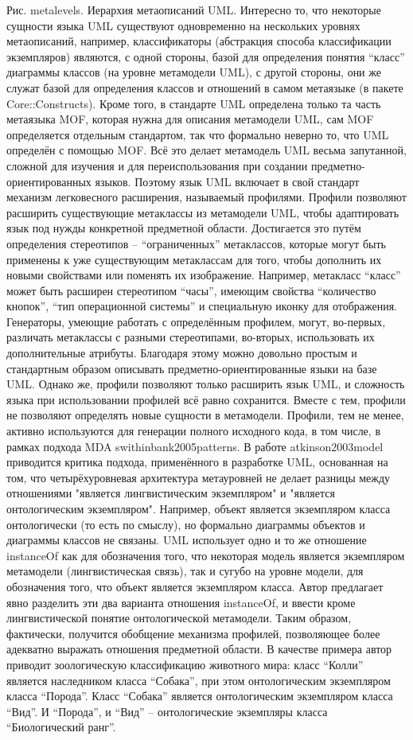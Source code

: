 Рис. metalevels. Иерархия метаописаний UML.
	Интересно то, что некоторые сущности языка UML существуют одновременно на нескольких уровнях метаописаний, например, классификаторы (абстракция способа классификации экземпляров) являются, с одной стороны, базой для определения понятия “класс” диаграммы классов (на уровне метамодели UML), с другой стороны, они же служат базой для определения классов и отношений в самом метаязыке (в пакете Core::Constructs). Кроме того, в стандарте UML определена только та часть метаязыка MOF, которая нужна для описания метамодели UML, сам MOF определяется отдельным стандартом, так что формально неверно то, что UML определён с помощью MOF. Всё это делает метамодель UML весьма запутанной, сложной для изучения и для переиспользования при создании предметно-ориентированных языков. 
Поэтому язык UML включает в свой стандарт механизм легковесного расширения, называемый профилями. Профили позволяют расширить существующие метаклассы из метамодели UML, чтобы адаптировать язык под нужды конкретной предметной области. Достигается это путём определения стереотипов – “ограниченных” метаклассов, которые могут быть применены к уже существующим метаклассам для того, чтобы дополнить их новыми свойствами или поменять их изображение. Например, метакласс “класс” может быть расширен стереотипом “часы”, имеющим свойства “количество кнопок”, “тип операционной системы” и специальную иконку для отображения. Генераторы, умеющие работать с определённым профилем, могут, во-первых, различать метаклассы с разными стереотипами, во-вторых, использовать их дополнительные атрибуты. Благодаря этому можно довольно простым и стандартным образом описывать предметно-ориентированные языки на базе UML. Однако же, профили позволяют только расширить язык UML, и сложность языка при использовании профилей всё равно сохранится. Вместе с тем, профили не позволяют определять новые сущности в метамодели. Профили, тем не менее, активно используются для генерации полного исходного кода, в том числе, в рамках подхода MDA swithinbank2005patterns.
В работе atkinson2003model приводится критика подхода, применённого в разработке UML, основанная на том, что четырёхуровневая архитектура метауровней не делает разницы между отношениями "является лингвистическим экземпляром" и "является онтологическим экземпляром". Например, объект является экземпляром класса онтологически (то есть по смыслу), но формально диаграммы объектов и диаграммы классов не связаны. UML использует одно и то же отношение instanceOf как для обозначения того, что некоторая модель является экземпляром метамодели (лингвистическая связь), так и сугубо на уровне модели, для обозначения того, что объект является экземпляром класса. Автор предлагает явно разделить эти два варианта отношения instanceOf, и ввести кроме лингвистической понятие онтологической метамодели. Таким образом, фактически, получится обобщение механизма профилей, позволяющее более адекватно выражать отношения предметной области. В качестве примера автор приводит зоологическую классификацию животного мира: класс “Колли” является наследником класса “Собака”, при этом онтологическим экземпляром класса “Порода”. Класс “Собака” является онтологическим экземпляром класса “Вид”. И “Порода”, и “Вид” – онтологические экземпляры класса “Биологический ранг”.
